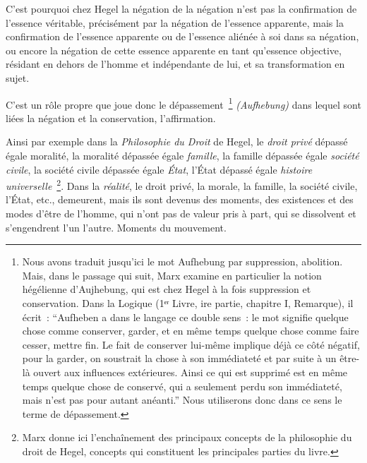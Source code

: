 \documentclass[french,twoside]{book} %
\begin{document}
C’est pourquoi chez Hegel la négation de la négation n’est pas la confirmation de l’essence véritable, précisément par la négation de l’essence apparente, mais la confirmation de l’essence apparente ou de l’essence aliénée à soi dans sa négation, ou encore la négation de cette essence apparente en tant qu’essence objective, résidant en dehors de l’homme et indépendante de lui, et sa transformation en sujet.\par
C’est un rôle propre que joue donc le dépassement \footnote{Nous avons traduit jusqu’ici le mot Aufhebung par suppression, abolition. Mais, dans le passage qui suit, Marx examine en particulier la notion hégélienne d’Aujhebung, qui est chez Hegel à la fois suppression et conservation. Dans la Logique (1ᵉʳ Livre, ire partie, chapitre I, Remarque), il écrit : “Aufheben a dans le langage ce double sens : le mot signifie quelque chose comme conserver, garder, et en même temps quelque chose comme faire cesser, mettre fin. Le fait de conserver lui-même implique déjà ce côté négatif, pour la garder, on soustrait la chose à son immédiateté et par suite à un être-là ouvert aux influences extérieures. Ainsi ce qui est supprimé est en même temps quelque chose de conservé, qui a seulement perdu son immédiateté, mais n’est pas pour autant anéanti.” Nous utiliserons donc dans ce sens le terme de dépassement.} \emph{(Aufhebung)} dans lequel sont liées la négation et la conservation, l’affirmation.\par
Ainsi par exemple dans la \emph{Philosophie du Droit} de Hegel, le \emph{droit privé} dépassé égale moralité, la moralité dépassée égale \emph{famille}, la famille dépassée égale \emph{société civile}, la société civile dépassée égale \emph{État}, l’État dépassé égale \emph{histoire universelle} \footnote{Marx donne ici l’enchaînement des principaux concepts de la philosophie du droit de Hegel, concepts qui constituent les principales parties du livre.}. Dans la \emph{réalité}, le droit privé, la morale, la famille, la société civile, l’État, etc., demeurent, mais ils sont devenus des moments, des existences et des modes d’être de l’homme, qui n’ont pas de valeur pris à part, qui se dissolvent et s’engendrent l’un l’autre. Moments du mouvement.\par
\end{document}
